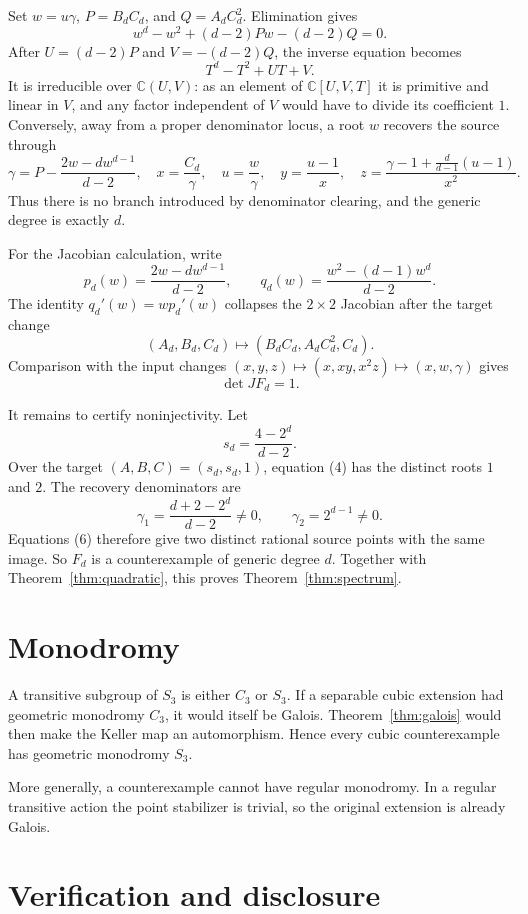 \documentclass[11pt]{article}
\theoremstyle{remark}
\newcommand{\C}{\mathbb C}
\begin{document}
Set $w=u\gamma$, $P=B_dC_d$, and $Q=A_dC_d^2$.  Elimination gives
\[
 w^d-w^2+(d-2)Pw-(d-2)Q=0.                           \tag{4}
\]
After $U=(d-2)P$ and $V=-(d-2)Q$, the inverse equation becomes
\[
 T^d-T^2+UT+V.                                       \tag{5}
\]
It is irreducible over $\C(U,V)$: as an element of
$\C[U,V,T]$ it is primitive and linear in $V$, and any factor independent of
$V$ would have to divide its coefficient $1$.  Conversely, away from a
proper denominator locus, a root $w$ recovers the source through
\[
 \gamma=P-\frac{2w-dw^{d-1}}{d-2},\quad
 x=\frac{C_d}{\gamma},\quad u=\frac w\gamma,\quad
 y=\frac{u-1}{x},\quad
 z=\frac{\gamma-1+\frac d{d-1}(u-1)}{x^2}.           \tag{6}
\]
Thus there is no branch introduced by denominator clearing, and the generic
degree is exactly $d$.

For the Jacobian calculation, write
\[
 p_d(w)=\frac{2w-dw^{d-1}}{d-2},\qquad
 q_d(w)=\frac{w^2-(d-1)w^d}{d-2}.
\]
The identity $q_d'(w)=wp_d'(w)$ collapses the $2\times2$ Jacobian after the
target change
\[
 (A_d,B_d,C_d)\mapsto(B_dC_d,A_dC_d^2,C_d).
\]
Comparison with the input changes
$(x,y,z)\mapsto(x,xy,x^2z)\mapsto(x,w,\gamma)$ gives
\[
 \det JF_d=1.                                        \tag{7}
\]

It remains to certify noninjectivity.  Let
\[
 s_d=\frac{4-2^d}{d-2}.
\]
Over the target $(A,B,C)=(s_d,s_d,1)$, equation (4) has the distinct roots
$1$ and $2$.  The recovery denominators are
\[
 \gamma_1=\frac{d+2-2^d}{d-2}\neq0,\qquad
 \gamma_2=2^{d-1}\neq0.
\]
Equations (6) therefore give two distinct rational source points with the
same image.  So $F_d$ is a counterexample of generic degree $d$.
Together with Theorem~\ref{thm:quadratic}, this proves
Theorem~\ref{thm:spectrum}.

\section{Monodromy}

A transitive subgroup of $S_3$ is either $C_3$ or $S_3$.  If a separable
cubic extension had geometric monodromy $C_3$, it would itself be Galois.
Theorem~\ref{thm:galois} would then make the Keller map an automorphism.
Hence every cubic counterexample has geometric monodromy $S_3$.

More generally, a counterexample cannot have regular monodromy.  In a regular
transitive action the point stabilizer is trivial, so the original extension
is already Galois.

\section{Verification and disclosure}
\end{document}
